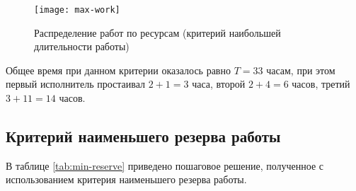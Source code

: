 \begin{figure}[H]
	\begin{center}
		\texttt{[image: max-work]}
		\caption{Распределение работ по ресурсам (критерий наибольшей длительности работы)}
		\label{fig:max-work}
	\end{center}
\end{figure}

Общее время при данном критерии оказалось равно $T = 33$ часам, при этом первый исполнитель простаивал $2 + 1 = 3$ часа, второй $2 + 4 = 6$ часов, третий $3 + 11 = 14$ часов.

\newpage

\subsection{Критерий наименьшего резерва работы}

В таблице \ref{tab:min-reserve} приведено пошаговое решение, полученное с использованием критерия наименьшего резерва работы.

